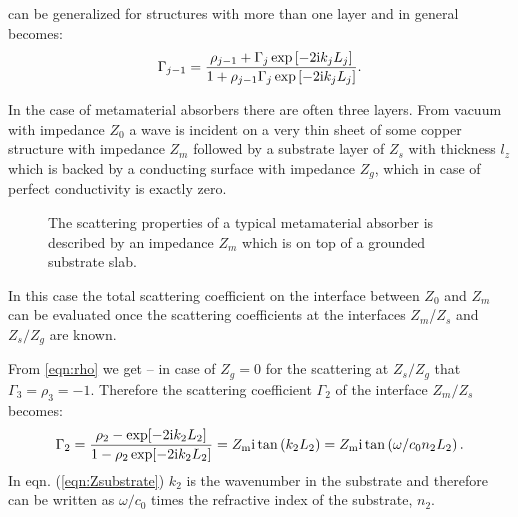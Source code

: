 can be generalized for structures with more than one layer and in general becomes:
\begin{equation}
\Gamma_{j-1} = \frac{\rho_{j-1}+\Gamma_j \exp\left[-2\mathrm{i} k_j L_j\right]}
{1+\rho_{j-1}\Gamma_j \exp\left[-2\mathrm{i} k_j L_j\right]}.
\label{eqn:NlayerGamma}
\end{equation}

In the case of metamaterial absorbers there are often three layers. From vacuum with impedance $Z_0$ a wave is incident on a very thin sheet of some copper structure with impedance $Z_m$ followed by a substrate layer of $Z_s$ with thickness $l_z$ which is backed by a conducting surface with impedance $Z_g$, which in case of perfect conductivity is exactly zero.

\begin{figure}
\centering
{}
\caption{The scattering properties of a typical metamaterial absorber is described by an impedance $Z_m$ which is on top of a grounded substrate slab.}
\label{fig:Nstacked_structure}
\end{figure}

In this case the total scattering coefficient on the interface between $Z_0$ and $Z_m$ can be evaluated once the scattering coefficients at the interfaces $Z_m$/$Z_s$ and $Z_s/Z_g$ are known.

From \cref{eqn:rho} we get -- in case of $Z_g=0$ for the scattering at $Z_s/Z_g$ that $\Gamma_3=\rho_3=-1$. Therefore the scattering coefficient $\Gamma_2$ of the interface $Z_m/Z_s$ becomes:
\begin{equation}
\Gamma_2 = \frac{\rho_2- \exp[-2\mathrm{i} k_2 L_2]}
			    {1-\rho_2\exp[-2\mathrm{i} k_2 L_2]}
	    =Z_\mathrm{m}\mathrm{i} \tan\left(k_2 L_2\right)
	    =Z_\mathrm{m}\mathrm{i} \tan\left(\omega/c_0 n_2 L_2\right).
\label{eqn:Zsubstrate}
\end{equation}
In eqn. (\ref{eqn:Zsubstrate}) $k_2$ is the wavenumber in the substrate and therefore can be written as $\omega/c_0$ times the refractive index of the substrate, $n_2$.



